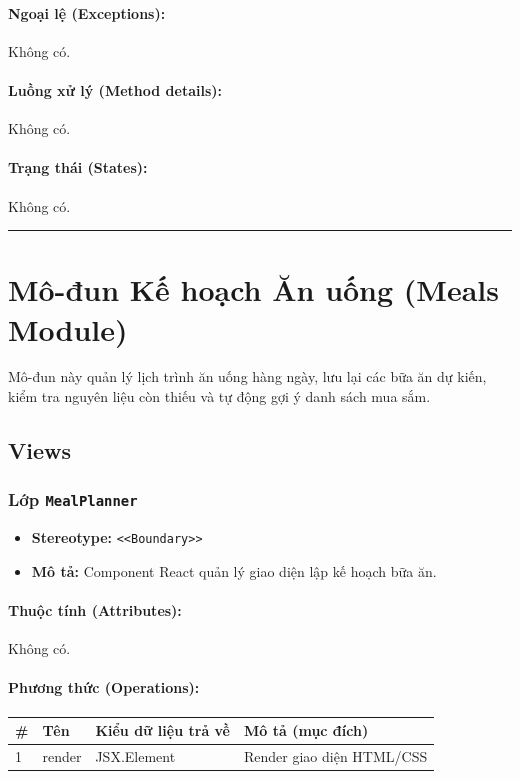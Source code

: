 \documentclass[12pt,a4paper]{article}
\begin{document}
\paragraph{Ngoại lệ (Exceptions):}
Không có.

\paragraph{Luồng xử lý (Method details):}
Không có.

\paragraph{Trạng thái (States):}
Không có.

\vskip 0.5cm
\noindent\rule{\textwidth}{0.5pt}
\vskip 0.5cm

\section{Mô-đun Kế hoạch Ăn uống (Meals Module)}


Mô-đun này quản lý lịch trình ăn uống hàng ngày, lưu lại các bữa ăn dự kiến, kiểm tra nguyên liệu còn thiếu và tự động gợi ý danh sách mua sắm.

\subsection{Views}


\subsubsection{Lớp \texttt{MealPlanner}}

\begin{itemize}[leftmargin=*]
    \item \textbf{Stereotype:} \texttt{\textless{}\textless{}Boundary\textgreater{}\textgreater{}}
    \item \textbf{Mô tả:} Component React quản lý giao diện lập kế hoạch bữa ăn.
\end{itemize}

\paragraph{Thuộc tính (Attributes):}
Không có.

\paragraph{Phương thức (Operations):}
\begin{longtable}{|p{0.6cm}|p{5.0cm}|p{2.8cm}|p{5.4cm}|}
\hline
\textbf{\#} & \textbf{Tên} & \textbf{Kiểu dữ liệu trả về} & \textbf{Mô tả (mục đích)} \\ \hline
\endhead
1 & render & JSX.Element & Render giao diện HTML/CSS \\ \hline
\end{longtable}
\end{document}
